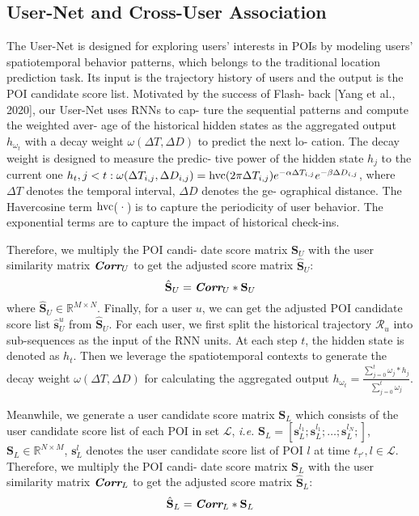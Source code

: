 \documentclass{article}
\begin{document}
\subsection{User-Net and Cross-User Association}
The User-Net is designed for exploring users’ interests in
POIs by modeling users’ spatiotemporal behavior patterns,
which belongs to the traditional location prediction task. Its
input is the trajectory history of users and the output is the
POI candidate score list. Motivated by the success of Flash-
back [Yang et al., 2020], our User-Net uses RNNs to cap-
ture the sequential patterns and compute the weighted aver-
age of the historical hidden states as the aggregated output $h_{\omega_t}$ with a decay weight $\omega(\Delta T, \Delta D)$ to predict the next lo-
cation. The decay weight is designed to measure the predic-
tive power of the hidden state $h_j$ to the current one $h_t, j < t: \omega(\Delta T_{i,j}, \Delta D_{i,j}) = \textnormal{hvc}(2\pi\Delta T_{i,j})e^{-\alpha\Delta T_{i,j}}e^{-\beta\Delta D_{i,j}}$, where $\Delta T$ denotes the temporal interval, $\Delta D$ denotes the ge-
ographical distance. The Havercosine term $\textnormal{hvc}$(·) is to capture the periodicity of user behavior. The exponential terms
are to capture the impact of historical check-ins.

Therefore, we multiply the POI candi-
date score matrix $\textbf{S}_U$ with the user similarity matrix $\textit{\textbf{Corr}}_U$ to get the adjusted score matrix $\hat{\textbf{S}}_U$:
\begin{equation} \label{eq:1}
    \hat{\textbf{S}}_U = \textit{\textbf{Corr}}_U * \textbf{S}_U
\end{equation}
where $\hat{\textbf{S}}_U \in \mathbb{R}^{M \times N}$. Finally, for a user $u$, we can get the adjusted POI candidate score list $\hat{\textbf{s}}^u_U$
from $\hat{\textbf{S}}_U$. For each user, we first split the historical trajectory $\mathcal{R}_u$ into sub-sequences as the input of the RNN units. At each
step $t$, the hidden state is denoted as $h_t$. Then we leverage the spatiotemporal contexts to generate the decay weight $\omega(\Delta T, \Delta D)$ for calculating the aggregated output $h_{\omega_t}  = \frac{\sum_{j=0}^{t}\omega_j*h_j}{\sum_{j=0}^{t}\omega_j}$.

Meanwhile, we generate a user candidate score matrix $\textbf{S}_L$ which
consists of the user candidate score list of each POI in set $\mathcal{L}$, \textit{i.e.} $\textbf{S}_L = [\textbf{s}_L^{l_1};\textbf{s}_L^{l_1};\hdots;\textbf{s}_L^{l_N};]$, $\textbf{S}_L \in \mathbb{R}^{N \times M}$, $\textbf{s}_L^{l}$ denotes the
user candidate score list of POI $l$ at time $t_{\tau'}, l \in \mathcal{L}$.
Therefore, we multiply the POI candi-
date score matrix $\textbf{S}_L$ with the user similarity matrix $\textit{\textbf{Corr}}_L$ to get the adjusted score matrix $\hat{\textbf{S}}_L$:
\begin{equation} \label{eq:2}
    \hat{\textbf{S}}_L = \textit{\textbf{Corr}}_L * \textbf{S}_L
\end{equation}
\end{document}
